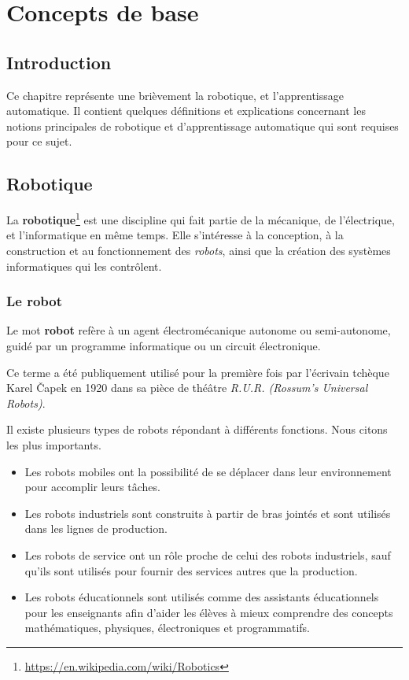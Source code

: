 \chapter{Concepts de base}

\section*{Introduction}

Ce chapitre représente une brièvement la robotique, et
l'apprentissage automatique. Il contient quelques définitions et explications
concernant les notions principales de robotique et d'apprentissage automatique
qui sont requises pour ce sujet.

\section{Robotique}

La \textbf{robotique}\footnote{\url{https://en.wikipedia.com/wiki/Robotics}}
est une discipline qui fait partie de la mécanique, de
l'électrique, et l'informatique en même temps. Elle s'intéresse à la conception,
à la construction et au fonctionnement des \emph{robots}, ainsi que la création
des systèmes informatiques qui les contrôlent.

\subsection{Le robot}

Le mot \textbf{robot} refère à un agent électromécanique autonome ou
semi-autonome, guidé par un programme informatique ou un circuit électronique.

Ce terme a été publiquement utilisé pour la première fois par l'écrivain tchèque
Karel Čapek en 1920 dans sa pièce de théâtre \emph{R.U.R.
(Rossum's Universal Robots)}.

Il existe plusieurs types de robots répondant à différents fonctions. Nous
citons les plus importants.

\begin{itemize}
  \item Les robots mobiles ont la possibilité de se déplacer dans leur
  environnement pour accomplir leurs tâches.
  \item Les robots industriels sont construits à partir de bras jointés et
  sont utilisés dans les lignes de production.
  \item Les robots de service ont un rôle proche de celui des robots
  industriels, sauf qu'ils sont utilisés pour fournir des services autres que
  la production.
  \item Les robots éducationnels sont utilisés comme des assistants
  éducationnels pour les enseignants afin d'aider les élèves à mieux comprendre
  des concepts mathématiques, physiques, électroniques et programmatifs.
\end{itemize}

